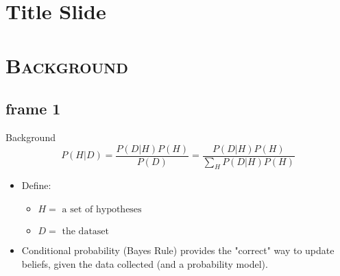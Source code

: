 \documentclass[xcolor=x11names,compress]{beamer}
\renewcommand{\(}{\begin{columns}}
\renewcommand{\)}{\end{columns}}
\newcommand{\<}[1]{\begin{column}{#1}}
\renewcommand{\>}{\end{column}}
\begin{document}
\section{Title Slide}

\section{\scshape Background}
\subsection{frame 1}
\begin{frame}{Background}
$$P(H|D)=\frac{P(D|H)P(H)}{P(D)}=\frac{P(D|H)P(H)}{\sum_H P(D|H)P(H)}$$
\begin{itemize}
\pause \item Define:
\begin{itemize}
\item $H=\text{ a set of hypotheses}$
\item $D=\text{ the dataset}$
\end{itemize}
\pause \item Conditional probability (Bayes Rule) provides the "correct" way to update beliefs, given the data collected (and a probability model).
\end{itemize}
\end{frame}

\end{document}
